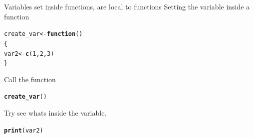 \documentclass{beamer}\usepackage[]{graphicx}\usepackage[]{color}
\makeatletter
\newcommand{\hlnum}[1]{\textcolor[rgb]{0.686,0.059,0.569}{#1}}%
\newcommand{\hlstd}[1]{\textcolor[rgb]{0.345,0.345,0.345}{#1}}%
\newcommand{\hlkwa}[1]{\textcolor[rgb]{0.161,0.373,0.58}{\textbf{#1}}}%
\newcommand{\hlkwb}[1]{\textcolor[rgb]{0.69,0.353,0.396}{#1}}%
\newcommand{\hlkwd}[1]{\textcolor[rgb]{0.737,0.353,0.396}{\textbf{#1}}}%
\newenvironment{kframe}{%
 \def\at@end@of@kframe{}%
 \ifinner\ifhmode%
  \def\at@end@of@kframe{\end{minipage}}%
  \begin{minipage}{\columnwidth}%
 \fi\fi%
 \def\FrameCommand##1{\hskip\@totalleftmargin \hskip-\fboxsep
 \colorbox{shadecolor}{##1}\hskip-\fboxsep
     \hskip-\linewidth \hskip-\@totalleftmargin \hskip\columnwidth}%
 \MakeFramed {\advance\hsize-\width
   \@totalleftmargin\z@ \linewidth\hsize
   \@setminipage}}%
 {\par\unskip\endMakeFramed%
 \at@end@of@kframe}
\newenvironment{knitrout}{}{} %
\makeatother
\begin{document}
\begin{frame}[fragile]{Variables set inside functions, are local to functions}
Setting the variable inside a function
\begin{knitrout}
\color{fgcolor}\begin{kframe}
\begin{alltt}
\hlstd{create_var} \hlkwb{<-} \hlkwa{function} \hlstd{()}
\hlstd{\{}
    \hlstd{var2} \hlkwb{<-} \hlkwd{c}\hlstd{(}\hlnum{1}\hlstd{,}\hlnum{2}\hlstd{,}\hlnum{3}\hlstd{)}
\hlstd{\}}
\end{alltt}
\end{kframe}
\end{knitrout}
Call the function
\begin{knitrout}
\color{fgcolor}\begin{kframe}
\begin{alltt}
\hlkwd{create_var}\hlstd{()}
\end{alltt}
\end{kframe}
\end{knitrout}
Try see whats inside the variable.
\begin{knitrout}
\color{fgcolor}\begin{kframe}
\begin{alltt}
\hlkwd{print}\hlstd{(var2)}
\end{alltt}


{\ttfamily\noindent\bfseries\color{errorcolor}{\#\# Error: object 'var2' not found}}\end{kframe}
\end{knitrout}
\end{frame}
\end{document}
